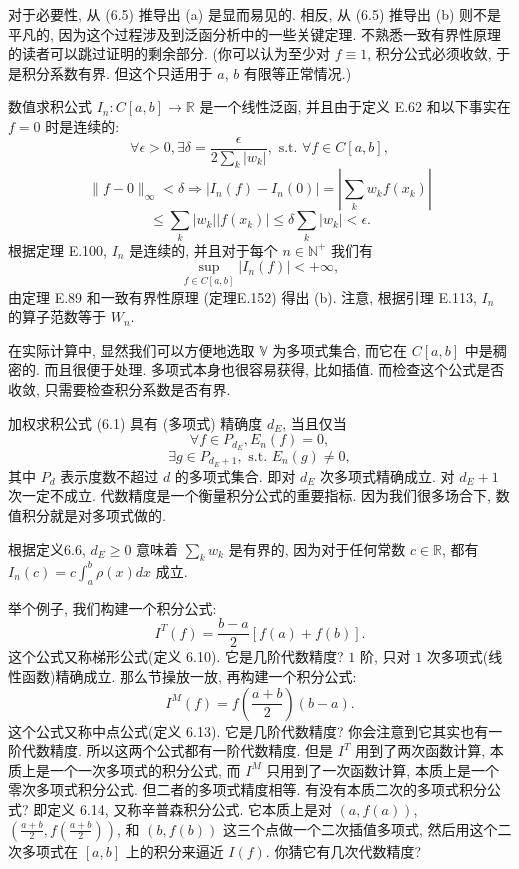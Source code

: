 \documentclass[a4paper]{ctexart}
\newcommand{\hl}[1]
{\noindent {\bf {#1}}}
\begin{document}
对于必要性, 从 (6.5) 推导出 (a) 是显而易见的. 相反, 从 (6.5) 推导出 (b) 则不是平凡的, 
因为这个过程涉及到泛函分析中的一些关键定理. 不熟悉一致有界性原理的读者可以跳过证明的剩余部分. 
(你可以认为至少对 $f \equiv 1$, 积分公式必须收敛, 于是积分系数有界. 但这个只适用于 $a$, $b$ 有限等正常情况.)

数值求积公式 $I_n : C[a, b] \rightarrow \mathbb{R}$ 是一个线性泛函, 并且由于定义 E.62 和以下事实在 $f = 0$ 
时是连续的:
\[ 
\forall \epsilon > 0, \exists \delta = \frac{\epsilon}{2 \sum_k |w_k|}, 
\text{ s.t. } \forall f \in C[a, b], 
\]
\[ 
\|f - 0\|_{\infty} < \delta \Rightarrow |I_n(f) - I_n(0)| = \left| \sum_k w_k f(x_k) \right|
\]
\[ 
\leq \sum_k |w_k| |f(x_k)| \leq \delta \sum_k |w_k| < \epsilon. 
\]
根据定理 E.100, $I_n$ 是连续的, 并且对于每个 $n \in \mathbb{N}^+$ 我们有
\[ 
\sup_{f \in C[a, b]} |I_n(f)| < +\infty, 
\]
由定理 E.89 和一致有界性原理 (定理E.152) 得出 (b). 注意, 根据引理 E.113, $I_n$ 的算子范数等于 $W_n$.

在实际计算中, 显然我们可以方便地选取 $\mathbb{V}$ 为多项式集合, 而它在 $C[a, b]$ 中是稠密的. 而且很便于处理. 
多项式本身也很容易获得, 比如插值. 而检查这个公式是否收敛, 只需要检查积分系数是否有界. 

\hl{定义6.6} 加权求积公式 (6.1) 具有 (多项式) 精确度 $d_E$, 当且仅当
\[ 
\forall f \in P_{d_E}, E_n(f) = 0, 
\]
\[ 
\exists g \in P_{d_E+1}, \text{ s.t. } E_n(g) \neq 0, 
\]
其中 $P_d$ 表示度数不超过 $d$ 的多项式集合. 即对 $d_E$ 次多项式精确成立. 对 $d_E + 1$ 次一定不成立. 
代数精度是一个衡量积分公式的重要指标. 因为我们很多场合下, 数值积分就是对多项式做的.

\hl{例6.7} 根据定义6.6, $d_E \geq 0$ 意味着 $\sum_k w_k$ 是有界的, 
因为对于任何常数 $c \in \mathbb{R}$, 都有 $I_n(c) = c \int_{a}^{b} \rho(x)dx$ 成立.

举个例子, 我们构建一个积分公式:
$$
I^T(f) = \frac{b - a}{2} [f(a) + f(b)].
$$
这个公式又称梯形公式(定义 6.10). 它是几阶代数精度? 
$1$ 阶, 只对 $1$ 次多项式(线性函数)精确成立. 
那么节操放一放, 再构建一个积分公式:
$$
I^M(f) = f(\frac{a + b}{2})(b - a).
$$
这个公式又称中点公式(定义 6.13). 它是几阶代数精度? 你会注意到它其实也有一阶代数精度. 
所以这两个公式都有一阶代数精度. 
但是 $I^T$ 用到了两次函数计算, 本质上是一个一次多项式的积分公式, 而 $I^M$ 只用到了一次函数计算, 
本质上是一个零次多项式积分公式. 但二者的多项式精度相等. 
有没有本质二次的多项式积分公式? 即定义 6.14, 又称辛普森积分公式. 它本质上是对 $(a, f(a))$, 
$\left(\frac{a + b}{2}, f\left(\frac{a + b}{2}\right)\right)$, 和 $(b, f(b))$ 这三个点做一个二次插值多项式,
然后用这个二次多项式在 $[a, b]$ 上的积分来逼近 $I(f)$. 你猜它有几次代数精度?
\end{document}
